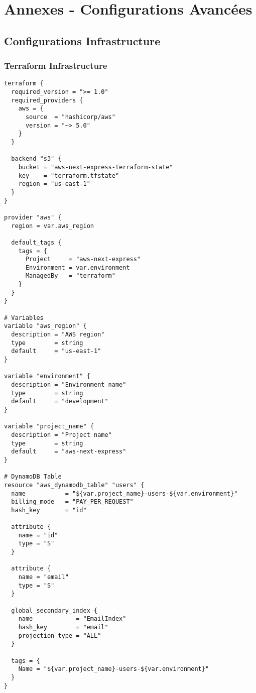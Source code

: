 \chapter{Annexes - Configurations Avancées}

\section{Configurations Infrastructure}

\subsection{Terraform Infrastructure}

\begin{lstlisting}[language=HCL, caption=terraform/main.tf]
terraform {
  required_version = ">= 1.0"
  required_providers {
    aws = {
      source  = "hashicorp/aws"
      version = "~> 5.0"
    }
  }
  
  backend "s3" {
    bucket = "aws-next-express-terraform-state"
    key    = "terraform.tfstate"
    region = "us-east-1"
  }
}

provider "aws" {
  region = var.aws_region
  
  default_tags {
    tags = {
      Project     = "aws-next-express"
      Environment = var.environment
      ManagedBy   = "terraform"
    }
  }
}

# Variables
variable "aws_region" {
  description = "AWS region"
  type        = string
  default     = "us-east-1"
}

variable "environment" {
  description = "Environment name"
  type        = string
  default     = "development"
}

variable "project_name" {
  description = "Project name"
  type        = string
  default     = "aws-next-express"
}

# DynamoDB Table
resource "aws_dynamodb_table" "users" {
  name           = "${var.project_name}-users-${var.environment}"
  billing_mode   = "PAY_PER_REQUEST"
  hash_key       = "id"
  
  attribute {
    name = "id"
    type = "S"
  }
  
  attribute {
    name = "email"
    type = "S"
  }
  
  global_secondary_index {
    name            = "EmailIndex"
    hash_key        = "email"
    projection_type = "ALL"
  }
  
  tags = {
    Name = "${var.project_name}-users-${var.environment}"
  }
}


\end{lstlisting}

